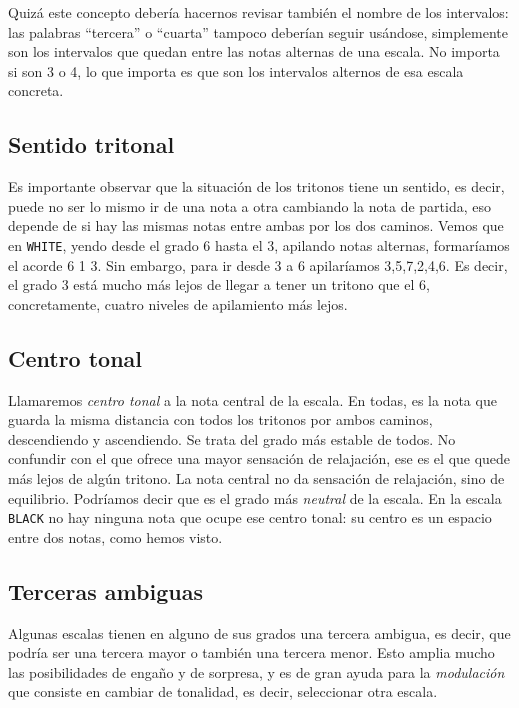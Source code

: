 \documentclass[]{report}
\begin{document}
Quizá este concepto debería hacernos revisar también el nombre de los intervalos: las palabras ``tercera'' o ``cuarta'' tampoco deberían seguir usándose, simplemente son los intervalos que quedan entre las notas alternas de una escala. No importa si son 3 o 4, lo que importa es que son los intervalos alternos de esa escala concreta.


\subsection{Sentido tritonal}
Es importante observar que la situación de los tritonos tiene un sentido, es decir, puede no ser lo mismo ir de una nota a otra cambiando la nota de partida, eso depende de si hay las mismas notas entre ambas por los dos caminos. Vemos que en \texttt{WHITE}, yendo desde el grado 6 hasta el 3, apilando notas alternas, formaríamos el acorde 6 1 3. Sin embargo, para ir desde 3 a 6 apilaríamos 3,5,7,2,4,6. Es decir, el grado 3 está mucho más lejos de llegar a tener un tritono que el 6, concretamente, cuatro niveles de apilamiento más lejos.

\subsection{Centro tonal}

Llamaremos \emph{centro tonal} a la nota central de la escala. En todas, es la nota que guarda la misma distancia con todos los tritonos por ambos caminos, descendiendo y ascendiendo. Se trata del grado más estable de todos. No confundir con el que ofrece una mayor sensación de relajación, ese es el que quede más lejos de algún tritono. La nota central no da sensación de relajación, sino de equilibrio. Podríamos decir que es el grado más \emph{neutral} de la escala. En la escala \texttt{BLACK} no hay ninguna nota que ocupe ese centro tonal: su centro es un espacio entre dos notas, como hemos visto.

\subsection{Terceras ambiguas}

Algunas escalas tienen en alguno de sus grados una tercera ambigua, es decir, que podría ser una tercera mayor o también una tercera menor. Esto amplia mucho las posibilidades de engaño y de sorpresa, y es de gran ayuda para la \emph{modulación} que consiste en cambiar de tonalidad, es decir, seleccionar otra escala.
\end{document}
